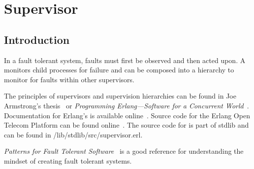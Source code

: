 %
%
%

\chapter {Supervisor}\label{chap:supervisor}

\section {Introduction}

In a fault tolerant system, faults must first be observed and then
acted upon. A  monitors child processes for failure
and can be composed into a hierarchy to monitor for faults within
other supervisors.

The principles of supervisors and supervision hierarchies can be found
in Joe Armstrong's thesis~\cite{armstrong-thesis} or \emph{Programming
  Erlang---Software for a Concurrent
  World}~\cite{programming-erlang}. Documentation for Erlang's
 is available online~\cite{supervisor-ref}. Source
code for the Erlang Open Telecom Platform can be found
online~\cite{erlang}. The source code for  is part
of stdlib and can be found in /lib/stdlib/src/supervisor.erl.

\emph{Patterns for Fault Tolerant
  Software}~\cite{patterns-for-fault-tolerant-software} is a good
reference for understanding the mindset of creating fault tolerant
systems.

